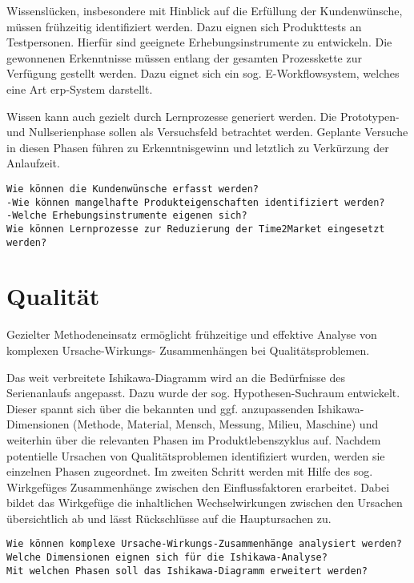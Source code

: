 Wissenslücken, insbesondere mit Hinblick auf die Erfüllung der Kundenwünsche, müssen frühzeitig identifiziert werden. Dazu eignen sich Produkttests an Testpersonen. Hierfür sind geeignete Erhebungsinstrumente zu entwickeln. Die gewonnenen Erkenntnisse müssen entlang der gesamten Prozesskette zur Verfügung gestellt werden. Dazu eignet sich ein sog. E-Workflowsystem, welches eine Art \gls{erp}-System darstellt. 

Wissen kann auch gezielt durch Lernprozesse generiert werden. Die Prototypen- und Nullserienphase sollen als Versuchsfeld betrachtet werden. Geplante Versuche in diesen Phasen führen zu Erkenntnisgewinn und letztlich zu Verkürzung der Anlaufzeit. 

\begin{verbatim}
Wie können die Kundenwünsche erfasst werden? 
-Wie können mangelhafte Produkteigenschaften identifiziert werden? 
-Welche Erhebungsinstrumente eigenen sich?
Wie können Lernprozesse zur Reduzierung der Time2Market eingesetzt werden? 
\end{verbatim}

\section{Qualität}

Gezielter Methodeneinsatz ermöglicht frühzeitige und effektive Analyse von komplexen Ursache-Wirkungs-%
Zusammenhängen bei Qualitätsproblemen. 

Das weit verbreitete Ishikawa-Diagramm wird an die Bedürfnisse des Serienanlaufs angepasst. Dazu wurde der sog. Hypothesen-Suchraum entwickelt. Dieser spannt sich über die bekannten und ggf. anzupassenden Ishikawa-Dimensionen (Methode, Material, Mensch, Messung, Milieu, Maschine) und weiterhin über die relevanten Phasen im Produktlebenszyklus auf. Nachdem potentielle Ursachen  von Qualitätsproblemen identifiziert wurden, werden sie einzelnen Phasen zugeordnet. Im zweiten Schritt werden mit Hilfe des sog. Wirkgefüges Zusammenhänge zwischen den Einflussfaktoren erarbeitet. Dabei bildet das Wirkgefüge die inhaltlichen Wechselwirkungen zwischen den Ursachen übersichtlich ab und lässt Rückschlüsse auf die Hauptursachen zu.

\begin{verbatim}
Wie können komplexe Ursache-Wirkungs-Zusammenhänge analysiert werden? 
Welche Dimensionen eignen sich für die Ishikawa-Analyse? 
Mit welchen Phasen soll das Ishikawa-Diagramm erweitert werden?
\end{verbatim}

